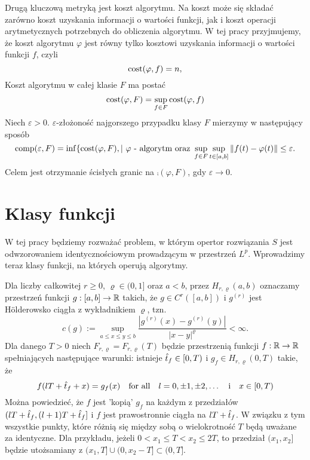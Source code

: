 \documentclass[oik, pdftex, robocza, man]{mgrwms}
\begin{document}
    Drugą kluczową metryką jest koszt algorytmu. Na koszt może się składać zarówno koszt uzyskania informacji o wartości funkcji, jak i koszt operacji arytmetycznych potrzebnych do obliczenia algorytmu. W tej pracy przyjmujemy, że koszt algorytmu $\varphi$ jest równy tylko kosztowi uzyskania informacji o wartości funkcji $f$, czyli
    \begin{equation*}
        \mathrm{cost}(\varphi, f) = n,
    \end{equation*}
    Koszt algorytmu w całej klasie $F$ ma postać
    \begin{equation*}
        \mathrm{cost}(\varphi, F) = \sup_{f \in F} \mathrm{cost}(\varphi, f)
    \end{equation*}
    Niech $\varepsilon > 0$. $\varepsilon$-złożoność najgorszego przypadku klasy $F$ mierzymy w następujący sposób
    \begin{equation*}
        \mathrm{comp}(\varepsilon, F) = \inf \{\mathrm{cost}(\varphi, F), | \text{ $\varphi$ - algorytm oraz } \sup_{f \in F} \sup_{t \in [a,b]} \|f(t) - \varphi(t)\| \leq \varepsilon.
    \end{equation*}
    Celem jest otrzymanie ścisłych granic na $\comp(\varphi, F)$, gdy $\varepsilon \rightarrow 0$.


\section{Klasy funkcji}

    W tej pracy będziemy rozważać problem, w którym opertor rozwiązania $S$ jest odwzorowaniem identycznościowym prowadzącym w przestrzeń $L^{p}$. Wprowadzimy teraz klasy funkcji, na których operują algorytmy.

    Dla liczby całkowitej $ r \geq 0$, $\varrho \in (0,1]$ oraz $a < b$, przez $H_{r, \varrho}(a,b)$ oznaczamy przestrzeń funkcji $g: [a,b] \rightarrow \mathbb{R}$ takich, że $g \in C^r([a, b])$ i $g^{(r)}$ jest Hölderowsko ciągła z wykładnikiem $\varrho$, tzn.
    \begin{equation*}
        c(g) := \sup_{a \leq x \leq y \leq b} \frac{|g^{(r)}(x) - g^{(r)}(y)|}{|x-y|^{\varrho}} < \infty.
    \end{equation*}
    Dla danego $T > 0$ niech $F_{r, \varrho} = F_{r, \varrho}(T)$ będzie przestrzenią funkcji $f: \mathbb{R} \rightarrow \mathbb{R}$ spełniających następujące warunki: istnieje $\hat{t}_{f} \in [0, T)$ i $g_f \in H_{r, \varrho}(0,T)$ takie, że
    \begin{equation*}
        f(lT + \hat{t}_f + x) = g_f(x) \quad \text{for all} \quad l = 0, \pm 1, \pm 2, \ldots \quad \text{i} \quad x \in [0, T)
    \end{equation*}
    Można powiedzieć, że $f$ jest 'kopią' $g_f$ na każdym z przedziałów $(lT + \hat{t}_f, (l + 1)T + \hat{t}_f]$ i $f$ jest prawostronnie ciągła na $lT + \hat{t}_f$. W związku z tym wszystkie punkty, które różnią się między sobą o wielokrotność $T$ będą uważane za identyczne. Dla przykładu, jeżeli $0 < x_1 \leq T < x_2 \leq 2T$, to przedział $(x_1, x_2]$ będzie utożsamiany z $(x_1,T] \cup (0, x_2 - T] \subset (0, T]$.
\end{document}
